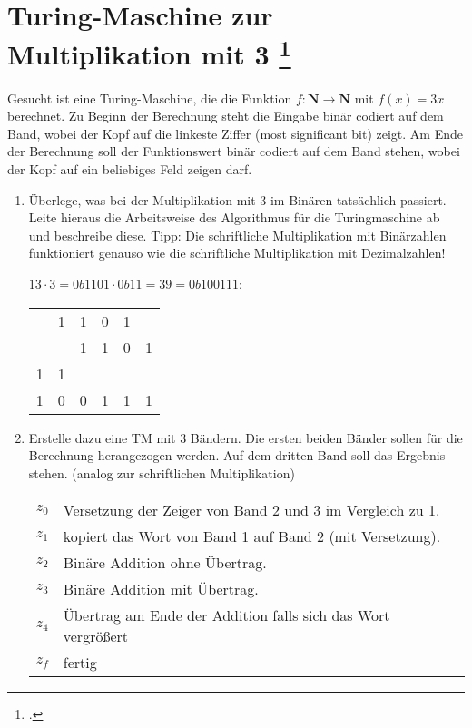 \documentclass{bschlangaul-aufgabe}
\begin{document}
\section{Turing-Maschine zur Multiplikation mit 3
\footcite[Aufgabe 5]{theo:ab:3}}

Gesucht ist eine Turing-Maschine, die die Funktion $f : \mathbf{N}
\rightarrow \mathbf{N}$ mit $f(x) = 3x$ berechnet. Zu Beginn der
Berechnung steht die Eingabe binär codiert auf dem Band, wobei der Kopf
auf die linkeste Ziffer (most significant bit) zeigt. Am Ende der
Berechnung soll der Funktionswert binär codiert auf dem Band stehen,
wobei der Kopf auf ein beliebiges Feld zeigen darf.

\begin{enumerate}


\item Überlege, was bei der Multiplikation mit 3 im Binären tatsächlich
passiert. Leite hieraus die Arbeitsweise des Algorithmus für die
Turingmaschine ab und beschreibe diese. Tipp: Die schriftliche
Multiplikation mit Binärzahlen funktioniert genauso wie die schriftliche
Multiplikation mit Dezimalzahlen!

\begin{liAntwort}
$13 \cdot 3 = 0b1101 \cdot 0b11 = 39 = 0b100111$:

\begin{center}
\begin{tabular}{llllll}
  & 1 & 1 & 0 & 1 &   \\
  &   & 1 & 1 & 0 & 1 \\
{\tiny 1} & {\tiny 1} &   &   &   &   \\\hline
1 & 0 & 0 & 1 & 1 & 1
\end{tabular}
\end{center}
\end{liAntwort}


\item Erstelle dazu eine TM mit 3 Bändern. Die ersten beiden Bänder
sollen für die Berechnung herangezogen werden. Auf dem dritten Band soll
das Ergebnis stehen. (analog zur schriftlichen Multiplikation)

\begin{liAntwort}
\begin{tabular}{ll}
$z_0$ & Versetzung der Zeiger von Band 2 und 3 im Vergleich zu 1. \\
$z_1$ & kopiert das Wort von Band 1 auf Band 2 (mit Versetzung). \\
$z_2$ & Binäre Addition ohne Übertrag. \\
$z_3$ & Binäre Addition mit Übertrag. \\
$z_4$ & Übertrag am Ende der Addition falls sich das Wort vergrößert \\
$z_f$ & fertig \\
\end{tabular}


\end{liAntwort}
\end{enumerate}
\end{document}
